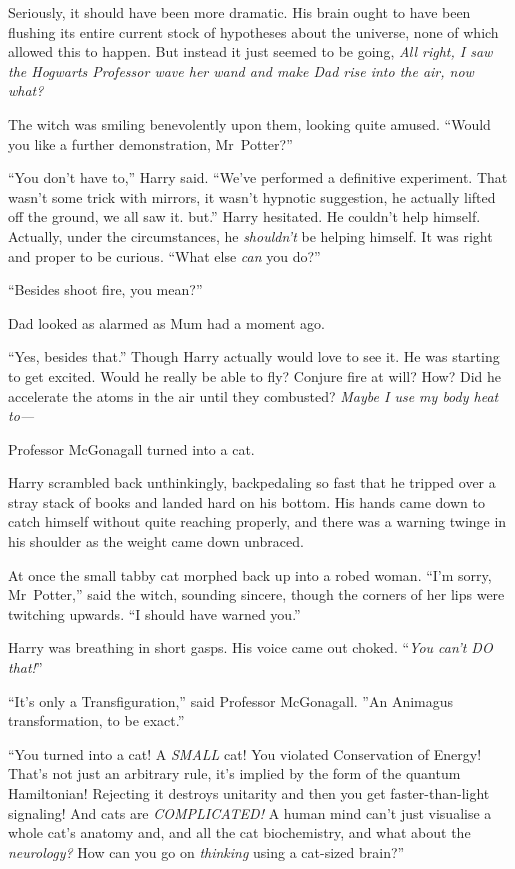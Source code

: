 Seriously, it should have been more dramatic. His brain
ought to have been flushing its entire current stock of
hypotheses about the universe, none of which allowed this
to happen. But instead it just seemed to be going, \emph{All
right, I saw the Hogwarts Professor wave her wand and
make Dad rise into the air, now what?}

The witch was smiling benevolently upon them, looking
quite amused. “Would you like a further demonstration, Mr~Potter?”

“You don’t have to,” Harry said. “We’ve performed a definitive
experiment. That wasn’t some trick with mirrors, it wasn’t
hypnotic suggestion, he actually lifted off the ground, we all
saw it. but.” Harry hesitated. He couldn’t help himself.
Actually, under the circumstances, he \emph{shouldn’t} be helping
himself. It was right and proper to be curious. “What else
\emph{can} you do?”

“Besides shoot fire, you mean?”

Dad looked as alarmed as Mum had a moment ago.

“Yes, besides that.” Though Harry actually would love to
see it. He was starting to get excited. Would he really be
able to fly? Conjure fire at will? How? Did he accelerate
the atoms in the air until they combusted? \emph{Maybe I use
my body heat to—}

Professor McGonagall turned into a cat.

Harry scrambled back unthinkingly, backpedaling so fast that he tripped over a
stray stack of books and landed hard on his bottom. His
hands came down to catch himself without quite reaching properly, and there was
a warning twinge in his shoulder as the weight came down unbraced.

At once the small tabby cat morphed back up into a robed woman. “I’m sorry,
Mr~Potter,” said the witch, sounding sincere, though the corners of her lips
were twitching upwards. “I should have warned you.”

Harry was breathing in short gasps. His voice came out choked.
“\emph{You can’t DO that!}”

“It’s only a Transfiguration,” said Professor McGonagall. ”An Animagus
transformation, to be exact.”

“You turned into a cat! A \emph{SMALL} cat! You violated Conservation of
Energy! That’s not just an arbitrary rule, it’s implied by the form of the
quantum Hamiltonian! Rejecting it destroys unitarity
and then you get faster-than-light signaling!
And cats are \emph{COMPLICATED!} A human mind can’t just visualise
a whole cat’s anatomy and, and all the cat biochemistry, and what about the
\emph{neurology?} How can you go on \emph{thinking} using a cat-sized brain?”

